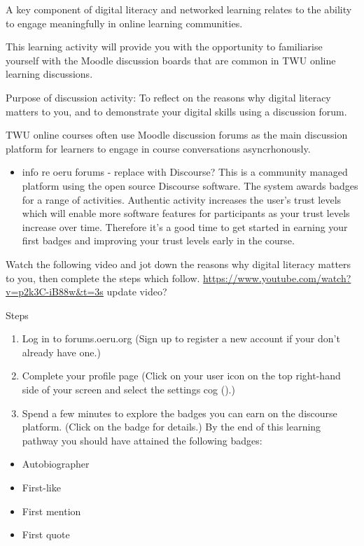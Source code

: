 \documentclass[
]{book}
\providecommand{\tightlist}{%
  \setlength{\itemsep}{0pt}\setlength{\parskip}{0pt}}
\theoremstyle{definition}
\theoremstyle{definition}
\theoremstyle{definition}
\theoremstyle{definition}
\theoremstyle{remark}
\begin{document}
\begin{reflect}
A key component of digital literacy and networked learning relates to the ability to engage meaningfully in online learning communities.

This learning activity will provide you with the opportunity to familiarise yourself with the Moodle discussion boards that are common in TWU online learning discussions.

Purpose of discussion activity:
To reflect on the reasons why digital literacy matters to you, and to demonstrate your digital skills using a discussion forum.

TWU online courses often use Moodle discussion forums as the main discussion platform for learners to engage in course conversations asyncrhonously.

\begin{itemize}
\tightlist
\item
  info re oeru forums - replace with Discourse?
  This is a community managed platform using the open source Discourse software. The system awards badges for a range of activities. Authentic activity increases the user's trust levels which will enable more software features for participants as your trust levels increase over time. Therefore it's a good time to get started in earning your first badges and improving your trust levels early in the course.
\end{itemize}

Watch the following video and jot down the reasons why digital literacy matters to you, then complete the steps which follow.
\url{https://www.youtube.com/watch?v=p2k3C-iB88w\&t=3s}
update video?

Steps

\begin{enumerate}
\def\labelenumi{\arabic{enumi}.}
\tightlist
\item
  Log in to forums.oeru.org (Sign up to register a new account if your don't already have one.)
\item
  Complete your profile page (Click on your user icon on the top right-hand side of your screen and select the settings cog ().)
\item
  Spend a few minutes to explore the badges you can earn on the discourse platform. (Click on the badge for details.) By the end of this learning pathway you should have attained the following badges:
\end{enumerate}

\begin{itemize}
\tightlist
\item
  Autobiographer
\item
  First-like
\item
  First mention
\item
  First quote
\end{itemize}


\end{reflect}
\end{document}
